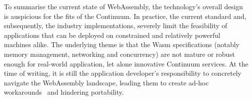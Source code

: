 


To summarise the current state of WebAssembly, the technology's overall design is auspicious for the fits of the Continuum. In practice, the current standard and, subsequently, the industry implementations, severely limit the feasibility of applications that can be deployed on constrained and relatively powerful machines alike. The underlying theme is that the Wasm specifications (notably memory management, networking and concurrency) are not mature or robust enough for real-world application, let alone innovative Continuum services. At the time of writing, it is still the application developer's responsibility to concretely navigate the WebAssembly landscape, leading them to create ad-hoc workarounds~\cite{wasm-experimental-http} and hindering portability.

